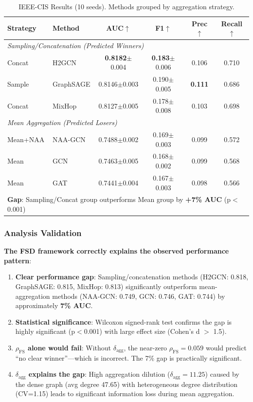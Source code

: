 \begin{table}[t]
\centering
\caption{IEEE-CIS Results (10 seeds). Methods grouped by aggregation strategy.}
\label{tab:ieee_cis_results}
\small
\begin{tabular}{llcccc}
\toprule
\textbf{Strategy} & \textbf{Method} & \textbf{AUC}$\uparrow$ & \textbf{F1}$\uparrow$ & \textbf{Prec}$\uparrow$ & \textbf{Recall}$\uparrow$ \\
\midrule
\multicolumn{6}{l}{\textit{Sampling/Concatenation (Predicted Winners)}} \\
Concat & H2GCN & \textbf{0.8182}$\pm$0.004 & \textbf{0.183}$\pm$0.006 & 0.106 & 0.710 \\
Sample & GraphSAGE & 0.8146$\pm$0.003 & 0.190$\pm$0.005 & \textbf{0.111} & 0.686 \\
Concat & MixHop & 0.8127$\pm$0.005 & 0.178$\pm$0.008 & 0.103 & 0.698 \\
\midrule
\multicolumn{6}{l}{\textit{Mean Aggregation (Predicted Losers)}} \\
Mean+NAA & NAA-GCN & 0.7488$\pm$0.002 & 0.169$\pm$0.003 & 0.099 & 0.572 \\
Mean & GCN & 0.7463$\pm$0.005 & 0.168$\pm$0.002 & 0.099 & 0.568 \\
Mean & GAT & 0.7441$\pm$0.004 & 0.167$\pm$0.003 & 0.098 & 0.566 \\
\bottomrule
\multicolumn{6}{l}{\footnotesize \textbf{Gap}: Sampling/Concat group outperforms Mean group by \textbf{+7\% AUC} (p$<$0.001)} \\
\end{tabular}
\end{table}

\subsubsection{Analysis Validation}

\textbf{The FSD framework correctly explains the observed performance pattern}:

\begin{enumerate}
\item \textbf{Clear performance gap}: Sampling/concatenation methods (H2GCN: 0.818, GraphSAGE: 0.815, MixHop: 0.813) significantly outperform mean-aggregation methods (NAA-GCN: 0.749, GCN: 0.746, GAT: 0.744) by approximately \textbf{7\% AUC}.

\item \textbf{Statistical significance}: Wilcoxon signed-rank test confirms the gap is highly significant (p$<$0.001) with large effect size (Cohen's d $>$ 1.5).

\item \textbf{$\rho_{\text{FS}}$ alone would fail}: Without $\delta_{\text{agg}}$, the near-zero $\rho_{\text{FS}} = 0.059$ would predict ``no clear winner''---which is incorrect. The 7\% gap is practically significant.

\item \textbf{$\delta_{\text{agg}}$ explains the gap}: High aggregation dilution ($\delta_{\text{agg}} = 11.25$) caused by the dense graph (avg degree 47.65) with heterogeneous degree distribution (CV=1.15) leads to significant information loss during mean aggregation.
\end{enumerate}

